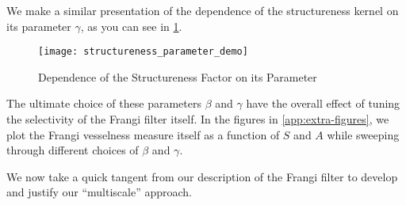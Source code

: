 We make a similar presentation of the dependence of the structureness kernel on its parameter $\gamma$, as you can see in \cref{fig:structureness-parameter-demo}.
\begin{figure}
  \texttt{[image: structureness\_parameter\_demo]}
  \caption{Dependence of the Structureness Factor on its Parameter}
  \label{fig:structureness-parameter-demo}
\end{figure}

The ultimate choice of these parameters $\beta$ and $\gamma$ have the overall effect of tuning the selectivity of the Frangi filter itself.
In the figures in \cref{app:extra-figures}, we plot the Frangi vesselness measure itself as a function of $S$ and $A$ while sweeping through different choices of $\beta$ and $\gamma$. 


	We now take a quick tangent from our description of the Frangi filter to develop and justify our ``multiscale'' approach.